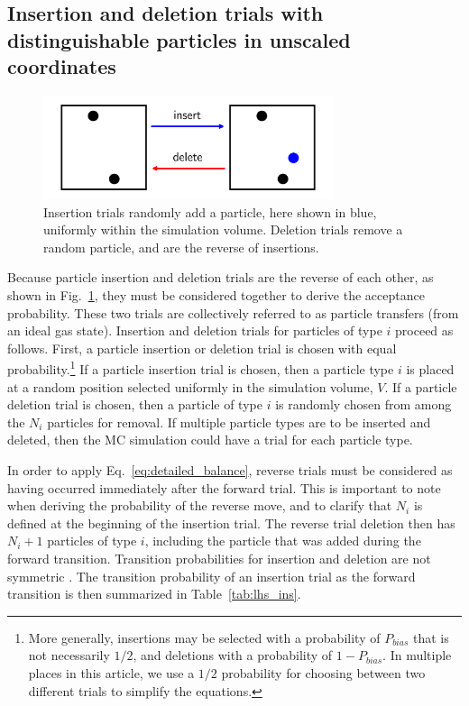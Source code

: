 \documentclass[
  9pt,
  bestpractices,
]{livecoms}
\begin{document}
\subsection{\label{sec:lhs_insdel}Insertion and deletion trials with distinguishable particles in unscaled coordinates}

\begin{figure}
\begin{centering}
\includegraphics[width=8.5cm]{../figures/muvt.png}
\caption{
Insertion trials randomly add a particle, here shown in blue, uniformly within the simulation volume.
Deletion trials remove a random particle, and are the reverse of insertions.
}
\label{fig:muvt}
\end{centering}
\end{figure}

Because particle insertion and deletion trials \cite{norman_investigation_1969, adams_grand_1975} are the reverse of each other, as shown in Fig.~\ref{fig:muvt}, they must be considered together to derive the acceptance probability.
These two trials are collectively referred to as particle transfers (from an ideal gas state).
Insertion and deletion trials for particles of type $i$ proceed as follows.
First, a particle insertion or deletion trial is chosen with equal probability.\footnote{More generally, insertions may be selected with a probability of $P_{bias}$ that is not necessarily $1/2$, and deletions with a probability of $1-P_{bias}$.
In multiple places in this article, we use a $1/2$ probability for choosing between two different trials to simplify the equations.}
If a particle insertion trial is chosen, then a particle type $i$ is placed at a random position selected uniformly in the simulation volume, $V$.
If a particle deletion trial is chosen, then a particle of type $i$ is randomly chosen from among the $N_i$ particles for removal.
If multiple particle types are to be inserted and deleted, then the MC simulation could have a trial for each particle type.

In order to apply Eq.~\ref{eq:detailed_balance}, reverse trials must be considered as having occurred immediately after the forward trial.
This is important to note when deriving the probability of the reverse move, and to clarify that $N_i$ is defined at the beginning of the insertion trial.
The reverse trial deletion then has $N_i+1$ particles of type $i$, including the particle that was added during the forward transition.
Transition probabilities for insertion and deletion are not symmetric \cite{norman_investigation_1969, hastings_monte_1970}.
The transition probability of an insertion trial as the forward transition is then summarized in Table~\ref{tab:lhs_ins}.
\end{document}
